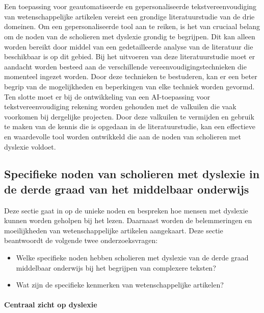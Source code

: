 \chapter{}%
\label{ch:stand-van-zaken}

Een toepassing voor geautomatiseerde en gepersonaliseerde tekstvereenvoudiging van wetenschappelijke artikelen vereist een grondige literatuurstudie van de drie domeinen. Om een gepersonaliseerde tool aan te reiken, is het van cruciaal belang om de noden van de scholieren met dyslexie grondig te begrijpen. Dit kan alleen worden bereikt door middel van een gedetailleerde analyse van de literatuur die beschikbaar is op dit gebied. Bij het uitvoeren van deze literatuurstudie moet er aandacht worden besteed aan de verschillende vereenvoudigingstechnieken die momenteel ingezet worden. Door deze technieken te bestuderen, kan er een beter begrip van de mogelijkheden en beperkingen van elke techniek worden gevormd. Ten slotte moet er bij de ontwikkeling van een AI-toepassing voor tekstvereenvoudiging rekening worden gehouden met de valkuilen die vaak voorkomen bij dergelijke projecten. Door deze valkuilen te vermijden en gebruik te maken van de kennis die is opgedaan in de literatuurstudie, kan een effectieve en waardevolle tool worden ontwikkeld die aan de noden van scholieren met dyslexie voldoet.

\section{Specifieke noden van scholieren met dyslexie in de derde graad van het middelbaar onderwijs}

Deze sectie gaat in op de unieke noden en bespreken hoe mensen met dyslexie kunnen worden geholpen bij het lezen. Daarnaast worden de belemmeringen en moeilijkheden van wetenschappelijke artikelen aangekaart. Deze sectie beantwoordt de volgende twee onderzoeksvragen: 
\begin{itemize}
	\item Welke specifieke noden hebben scholieren met dyslexie van de derde graad middelbaar onderwijs bij het begrijpen van complexere teksten?
	\item Wat zijn de specifieke kenmerken van wetenschappelijke artikelen?
\end{itemize}



\subsubsection{Centraal zicht op dyslexie}


